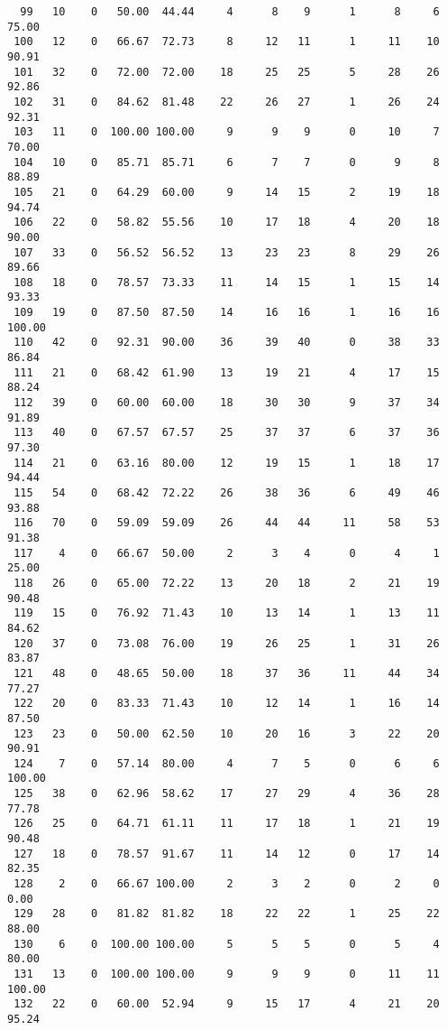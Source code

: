 \begin{verbatim}
  99   10    0   50.00  44.44     4      8    9      1      8     6    75.00
 100   12    0   66.67  72.73     8     12   11      1     11    10    90.91
 101   32    0   72.00  72.00    18     25   25      5     28    26    92.86
 102   31    0   84.62  81.48    22     26   27      1     26    24    92.31
 103   11    0  100.00 100.00     9      9    9      0     10     7    70.00
 104   10    0   85.71  85.71     6      7    7      0      9     8    88.89
 105   21    0   64.29  60.00     9     14   15      2     19    18    94.74
 106   22    0   58.82  55.56    10     17   18      4     20    18    90.00
 107   33    0   56.52  56.52    13     23   23      8     29    26    89.66
 108   18    0   78.57  73.33    11     14   15      1     15    14    93.33
 109   19    0   87.50  87.50    14     16   16      1     16    16   100.00
 110   42    0   92.31  90.00    36     39   40      0     38    33    86.84
 111   21    0   68.42  61.90    13     19   21      4     17    15    88.24
 112   39    0   60.00  60.00    18     30   30      9     37    34    91.89
 113   40    0   67.57  67.57    25     37   37      6     37    36    97.30
 114   21    0   63.16  80.00    12     19   15      1     18    17    94.44
 115   54    0   68.42  72.22    26     38   36      6     49    46    93.88
 116   70    0   59.09  59.09    26     44   44     11     58    53    91.38
 117    4    0   66.67  50.00     2      3    4      0      4     1    25.00
 118   26    0   65.00  72.22    13     20   18      2     21    19    90.48
 119   15    0   76.92  71.43    10     13   14      1     13    11    84.62
 120   37    0   73.08  76.00    19     26   25      1     31    26    83.87
 121   48    0   48.65  50.00    18     37   36     11     44    34    77.27
 122   20    0   83.33  71.43    10     12   14      1     16    14    87.50
 123   23    0   50.00  62.50    10     20   16      3     22    20    90.91
 124    7    0   57.14  80.00     4      7    5      0      6     6   100.00
 125   38    0   62.96  58.62    17     27   29      4     36    28    77.78
 126   25    0   64.71  61.11    11     17   18      1     21    19    90.48
 127   18    0   78.57  91.67    11     14   12      0     17    14    82.35
 128    2    0   66.67 100.00     2      3    2      0      2     0     0.00
 129   28    0   81.82  81.82    18     22   22      1     25    22    88.00
 130    6    0  100.00 100.00     5      5    5      0      5     4    80.00
 131   13    0  100.00 100.00     9      9    9      0     11    11   100.00
 132   22    0   60.00  52.94     9     15   17      4     21    20    95.24

\end{verbatim}
